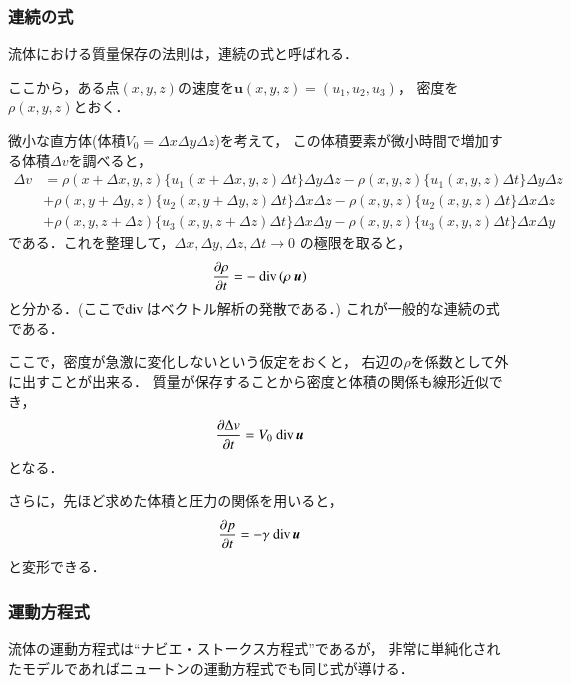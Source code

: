 \subsubsection{連続の式}

流体における質量保存の法則は，連続の式と呼ばれる．

ここから，ある点$(x, y, z)$の速度を${\bm u}(x, y, z)=(u_1, u_2, u_3)$，
密度を$\rho(x, y, z)$とおく．

微小な直方体(体積$V_0=\Delta x\Delta y\Delta z$)を考えて，
この体積要素が微小時間で増加する体積$\Delta v$を調べると，
\begin{align}
\Delta v
&=\rho(x+\Delta x, y, z)\{u_1(x+\Delta x, y, z)\Delta t\} \Delta y \Delta z -\rho(x, y, z)\{u_1(x, y, z)\Delta t\}\Delta y \Delta z \nonumber \\
&+\rho(x, y+\Delta y, z)\{u_2(x, y+\Delta y, z)\Delta t\} \Delta x \Delta z -\rho(x, y, z)\{u_2(x, y, z)\Delta t\}\Delta x \Delta z \nonumber \\
&+\rho(x, y, z+\Delta z)\{u_3(x, y, z+\Delta z)\Delta t\} \Delta x \Delta y -\rho(x, y, z)\{u_3(x, y, z)\Delta t\}\Delta x \Delta y
\end{align}
である．これを整理して，$\Delta x, \Delta y, \Delta z, \Delta t\rightarrow 0$
の極限を取ると，
\begin{align}
\frac{\partial\rho}{\partial t}=-~\mathrm{div}\,(\rho~{\bm u})
\end{align}
と分かる．(ここで$\mathrm{div}\,$はベクトル解析の発散である．)
これが一般的な連続の式である．

ここで，密度が急激に変化しないという仮定をおくと，
右辺の$\rho$を係数として外に出すことが出来る．
質量が保存することから密度と体積の関係も線形近似でき，
\begin{align}
\frac{\partial \Delta v}{\partial t}=V_0~\mathrm{div}\, {\bm u}
\end{align}
となる．

さらに，先ほど求めた体積と圧力の関係を用いると，
\begin{align}
\frac{\partial p}{\partial t}=-\gamma~\mathrm{div}\, {\bm u}
\end{align}
と変形できる．

\subsubsection{運動方程式}

流体の運動方程式は``ナビエ・ストークス方程式''であるが，
非常に単純化されたモデルであればニュートンの運動方程式でも同じ式が導ける．


